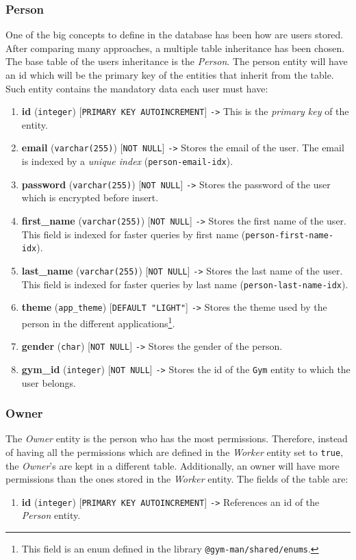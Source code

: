 \documentclass[a4paper, 12pt, oneside]{book}
\begin{document}
\subsubsection{Person}
One of the big concepts to define in the database has been how are users stored. After comparing many approaches, a multiple table inheritance has been chosen. The base table of the users inheritance is the \emph{Person}. The person entity will have an id which will be the primary key of the entities that inherit from the table. Such entity contains the mandatory data each user must have:
\begin{enumerate}[label = -]
	\item \textbf{id} (\texttt{integer}) [\texttt{PRIMARY KEY AUTOINCREMENT}] \texttt{->} This is the \emph{primary key} of the entity.
	\item \textbf{email} (\texttt{varchar(255)}) [\texttt{NOT NULL}] \texttt{->} Stores the email of the user. The email is indexed by a \emph{unique index} (\texttt{person-email-idx}).
	\item \textbf{password} (\texttt{varchar(255)}) [\texttt{NOT NULL}] \texttt{->} Stores the password of the user which is encrypted before insert.
	\item \textbf{first\_name} (\texttt{varchar(255)}) [\texttt{NOT NULL}] \texttt{->} Stores the first name of the user. This field is indexed for faster queries by first name (\texttt{person-first-name-idx}).
	\item \textbf{last\_name} (\texttt{varchar(255)}) [\texttt{NOT NULL}] \texttt{->} Stores the last name of the user. This field is indexed for faster queries by last name (\texttt{person-last-name-idx}).
	\item \textbf{theme} (\texttt{app\_theme}) [\texttt{DEFAULT "LIGHT"}] \texttt{->} Stores the theme used by the person in the different applications\footnote{This field is an enum defined in the library \texttt{@gym-man/shared/enums}.}.
	\item \textbf{gender} (\texttt{char}) [\texttt{NOT NULL}] \texttt{->} Stores the gender of the person.
	\item \textbf{gym\_id} (\texttt{integer}) [\texttt{NOT NULL}] \texttt{->} Stores the id of the \texttt{Gym} entity to which the user belongs.
\end{enumerate}
\subsubsection{Owner}
The \emph{Owner} entity is the person who has the most permissions. Therefore, instead of having all the permissions which are defined in the \emph{Worker} entity set to \texttt{true}, the \emph{Owner}'s are kept in a different table. Additionally, an owner will have more permissions than the ones stored in the \emph{Worker} entity. The fields of the table are:
\begin{enumerate}[label = -]
	\item \textbf{id} (\texttt{integer}) [\texttt{PRIMARY KEY AUTOINCREMENT}] \texttt{->} References an id of the \emph{Person} entity.
\end{enumerate}
\end{document}
